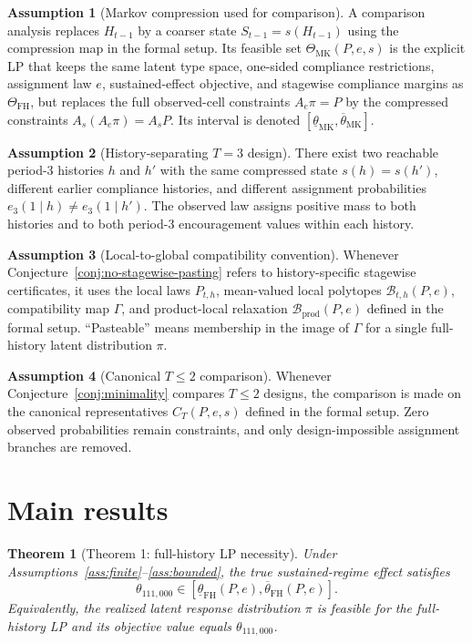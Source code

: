 \documentclass[11pt]{article}
\theoremstyle{definition}
\newtheorem{assumption}{Assumption}
\theoremstyle{plain}
\newtheorem{theorem}{Theorem}
\theoremstyle{remark}
\begin{document}
\begin{assumption}[Markov compression used for comparison]\label{ass:markov-compression}
A comparison analysis replaces \(H_{t-1}\) by a coarser state \(S_{t-1}=s(H_{t-1})\) using the compression map in the formal setup.  Its feasible set \(\Theta_{\mathrm{MK}}(P,e,s)\) is the explicit LP that keeps the same latent type space, one-sided compliance restrictions, assignment law \(e\), sustained-effect objective, and stagewise compliance margins as \(\Theta_{\mathrm{FH}}\), but replaces the full observed-cell constraints \(A_e\pi=P\) by the compressed constraints \(A_s(A_e\pi)=A_sP\).  Its interval is denoted \([\underline\theta_{\mathrm{MK}},\overline\theta_{\mathrm{MK}}]\).
\end{assumption}

\begin{assumption}[History-separating \(T=3\) design]\label{ass:history-separating}
There exist two reachable period-3 histories \(h\) and \(h'\) with the same compressed state \(s(h)=s(h')\), different earlier compliance histories, and different assignment probabilities \(e_3(1\mid h)\ne e_3(1\mid h')\).  The observed law assigns positive mass to both histories and to both period-3 encouragement values within each history.
\end{assumption}

\begin{assumption}[Local-to-global compatibility convention]\label{ass:local-compatibility}
Whenever Conjecture~\ref{conj:no-stagewise-pasting} refers to history-specific stagewise certificates, it uses the local laws \(P_{t,h}\), mean-valued local polytopes \(\mathcal{B}_{t,h}(P,e)\), compatibility map \(\Gamma\), and product-local relaxation \(\mathcal{B}_{\mathrm{prod}}(P,e)\) defined in the formal setup.  ``Pasteable'' means membership in the image of \(\Gamma\) for a single full-history latent distribution \(\pi\).
\end{assumption}

\begin{assumption}[Canonical \(T\le2\) comparison]\label{ass:canonical-t2}
Whenever Conjecture~\ref{conj:minimality} compares \(T\le2\) designs, the comparison is made on the canonical representatives \(C_T(P,e,s)\) defined in the formal setup.  Zero observed probabilities remain constraints, and only design-impossible assignment branches are removed.
\end{assumption}

\section{Main results}
\begin{theorem}[Theorem 1: full-history LP necessity]\label{thm:fh-lp-necessity}
Under Assumptions~\ref{ass:finite}--\ref{ass:bounded}, the true sustained-regime effect satisfies
\[
\theta_{111,000}\in
[\underline\theta_{\mathrm{FH}}(P,e),\overline\theta_{\mathrm{FH}}(P,e)].
\]
Equivalently, the realized latent response distribution \(\pi\) is feasible for the full-history LP and its objective value equals \(\theta_{111,000}\).
\end{theorem}
\end{document}
